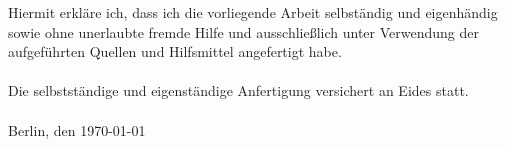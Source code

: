 
\thispagestyle{fancy}
\newpage
\noindent
Hiermit erkläre ich, dass ich die vorliegende Arbeit selbständig und eigenhändig sowie
ohne unerlaubte fremde Hilfe und ausschließlich unter Verwendung der aufgeführten Quellen und Hilfsmittel angefertigt habe.
\\
\\
Die selbstständige und eigenständige Anfertigung versichert an Eides statt.
\\
\\
Berlin, den \today
\vspace{1cm}
\begin{tabular}{@{}l@{}}\hline
\end{tabular}




